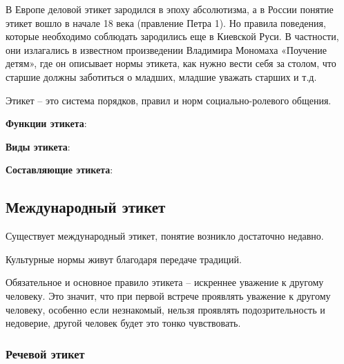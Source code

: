 \documentclass[a4paper,14pt]{extarticle}
\begin{document}
В Европе деловой этикет зародился в эпоху абсолютизма, а в России понятие этикет вошло в начале 18 века (правление Петра 1). Но правила поведения, которые необходимо соблюдать зародились еще в Киевской Руси. В частности, они излагались в известном произведении Владимира Мономаха «Поучение детям», где он описывает нормы этикета, как нужно вести себя за столом, что старшие должны заботиться о младших, младшие уважать
старших и т.д.

Этикет – это система порядков, правил и норм социально-ролевого
общения.

\textbf{Функции этикета}:

\begin{multienumerate}
\end{multienumerate}

\textbf{Виды этикета}:

\begin{multienumerate}
\end{multienumerate}

\textbf{Составляющие этикета}:

\begin{multienumerate}
\end{multienumerate}

\subsection{Международный этикет}

Существует международный этикет, понятие возникло достаточно недавно.

Культурные нормы живут благодаря передаче традиций.

Обязательное и основное правило этикета – искреннее уважение к другому человеку. Это значит, что при первой встрече проявлять уважение к другому человеку, особенно если незнакомый, нельзя проявлять подозрительность и недоверие, другой человек будет это тонко чувствовать.

\subsubsection{Речевой этикет}
\end{document}

